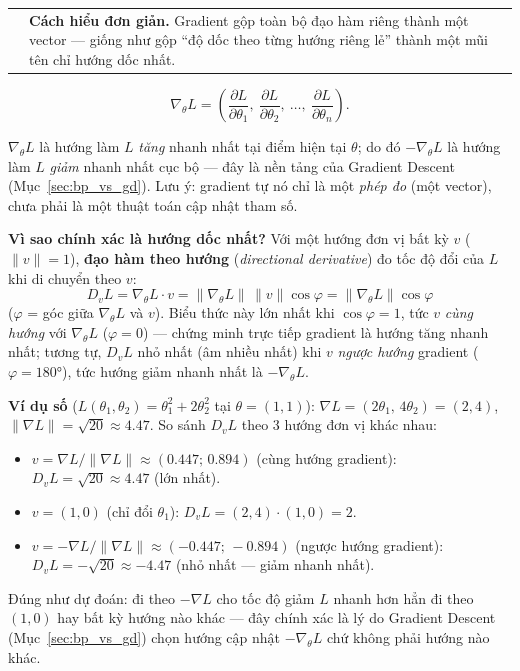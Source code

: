 \documentclass[12pt,a4paper]{article}
\makeatletter
\newenvironment{tructiep}[1][Cách hiểu đơn giản]
  {\par\smallskip\noindent\begin{tabular}{@{}p{0.35em}@{\hspace{6pt}}p{\dimexpr\linewidth-1.9em\relax}@{}}
   \textcolor{boxln}{\rule{2pt}{\baselineskip}} & \textbf{#1.}\enspace\ignorespaces}
  {\end{tabular}\par\smallskip}
\newcommand{\en}[1]{\textit{#1}}
\makeatother
\begin{document}
\begin{tructiep}
Gradient gộp toàn bộ đạo hàm riêng thành một vector --- giống như gộp ``độ
dốc theo từng hướng riêng lẻ'' thành một mũi tên chỉ hướng dốc nhất.
\end{tructiep}

$$\nabla_\theta L = \left(\frac{\partial L}{\partial\theta_1},\ \frac{\partial L}{\partial\theta_2},\ \ldots,\ \frac{\partial L}{\partial\theta_n}\right).$$

$\nabla_\theta L$ là hướng làm $L$ \emph{tăng} nhanh nhất tại điểm hiện tại
$\theta$; do đó $-\nabla_\theta L$ là hướng làm $L$ \emph{giảm} nhanh nhất
cục bộ --- đây là nền tảng của Gradient Descent (Mục~\ref{sec:bp_vs_gd}).
Lưu ý: gradient tự nó chỉ là một \emph{phép đo} (một vector), chưa phải là
một thuật toán cập nhật tham số.

\textbf{Vì sao chính xác là hướng dốc nhất?} Với một hướng đơn vị bất kỳ
$v$ ($\lVert v\rVert=1$), \textbf{đạo hàm theo hướng} (\en{directional
derivative}) đo tốc độ đổi của $L$ khi di chuyển theo $v$:
$$D_v L = \nabla_\theta L \cdot v = \lVert\nabla_\theta L\rVert\,\lVert v\rVert\cos\varphi = \lVert\nabla_\theta L\rVert\cos\varphi$$
($\varphi$ = góc giữa $\nabla_\theta L$ và $v$). Biểu thức này lớn nhất
khi $\cos\varphi=1$, tức $v$ \emph{cùng hướng} với $\nabla_\theta L$
($\varphi=0$) --- chứng minh trực tiếp gradient là hướng tăng nhanh nhất;
tương tự, $D_vL$ nhỏ nhất (âm nhiều nhất) khi $v$ \emph{ngược hướng}
gradient ($\varphi=180°$), tức hướng giảm nhanh nhất là $-\nabla_\theta L$.

\textbf{Ví dụ số} ($L(\theta_1,\theta_2)=\theta_1^2+2\theta_2^2$ tại
$\theta=(1,1)$): $\nabla L = (2\theta_1,\,4\theta_2) = (2,4)$,
$\lVert\nabla L\rVert=\sqrt{20}\approx4.47$. So sánh $D_vL$ theo 3 hướng
đơn vị khác nhau:
\begin{itemize}
\item $v=\nabla L/\lVert\nabla L\rVert\approx(0.447;\,0.894)$ (cùng hướng gradient): $D_vL=\sqrt{20}\approx4.47$ (lớn nhất).
\item $v=(1,0)$ (chỉ đổi $\theta_1$): $D_vL = (2,4)\cdot(1,0)=2$.
\item $v=-\nabla L/\lVert\nabla L\rVert\approx(-0.447;\,-0.894)$ (ngược hướng gradient): $D_vL=-\sqrt{20}\approx-4.47$ (nhỏ nhất --- giảm nhanh nhất).
\end{itemize}
Đúng như dự đoán: đi theo $-\nabla L$ cho tốc độ giảm $L$ nhanh hơn hẳn đi
theo $(1,0)$ hay bất kỳ hướng nào khác --- đây chính xác là lý do
Gradient Descent (Mục~\ref{sec:bp_vs_gd}) chọn hướng cập nhật
$-\nabla_\theta L$ chứ không phải hướng nào khác.
\end{document}

